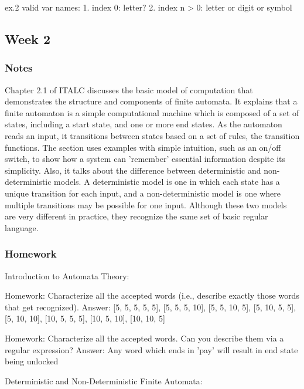 \documentclass{article}
\theoremstyle{theorem}
\theoremstyle{definition}
\theoremstyle{remark}
\begin{document}
ex.2 valid var names:
1. index 0: letter?
2. index n > 0: letter or digit or symbol

\subsection{Week 2}

\subsubsection*{Notes}

Chapter 2.1 of ITALC discusses the basic model of computation that demonstrates the structure and components of finite automata. It explains that a finite automaton is a simple computational machine which is composed of a set of states, including a start state, and one or more end states. As the automaton reads an input, it transitions between states based on a set of rules, the transition functions. The section uses examples with simple intuition, such as an on/off switch, to show how a system can 'remember' essential information despite its simplicity. Also, it talks about the difference between deterministic and non-deterministic models. A deterministic model is one in which each state has a unique transition for each input, and a non-deterministic model is one where multiple transitions may be possible for one input. Although these two models are very different in practice, they recognize the same set of basic regular language. 

\subsubsection*{Homework}

Introduction to Automata Theory:

Homework: Characterize all the accepted words (i.e., describe exactly those words that get recognized).\newline
Answer:  [5, 5, 5, 5, 5], [5, 5, 5, 10], [5, 5, 10, 5], [5, 10, 5, 5], [5, 10, 10], [10, 5, 5, 5], [10, 5, 10], [10, 10, 5]

Homework: Characterize all the accepted words. Can you describe them via a regular expression?\newline
Answer: Any word which ends in 'pay' will result in end state being unlocked

Deterministic and Non-Deterministic Finite Automata:
\end{document}
